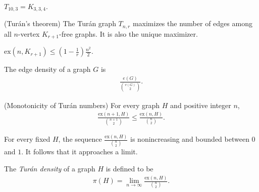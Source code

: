 \documentclass[11pt]{article}
\begin{document}
\begin{example} $T_{10, 3} = K_{3, 3, 4}$.
\end{example}

\begin{theorem} (Turán's theorem) The Turán graph $T_{n, r}$ maximizes the number of edges among all $n$-vertex $K_{r+1}$-free graphs. It is also the unique maximizer.
\end{theorem}

\begin{corollary} $\mathrm{ex} (n, K_{r + 1}) \le \left( 1 - \frac{1}{r} \right) \frac{n^2}{2}$. 
\end{corollary}

\begin{definition} The edge density of a graph $G$ is \begin{align*} \frac{e(G)}{{v(G) \choose 2}}.
\end{align*}
\end{definition}

\begin{proposition} (Monotonicity of Turán numbers) For every graph $H$ and positive integer $n$, \begin{align*} \frac{\mathrm{ex} (n + 1, H)}{n + 1 \choose 2} \le \frac{\mathrm{ex}(n, H)}{n \choose 2}.
\end{align*}
\end{proposition}

For every fixed $H$, the sequence $\frac{\mathrm{ex}(n, H)}{n \choose 2}$ is nonincreasing and bounded between $0$ and $1$. It follows that it approaches a limit.

\begin{definition} The \emph{Turán density} of a graph $H$ is defined to be \begin{align*} \pi(H) = \lim_{n \to \infty} \frac{\mathrm{ex}(n, H)}{n \choose 2}.
\end{align*}
\end{definition}
\end{document}
